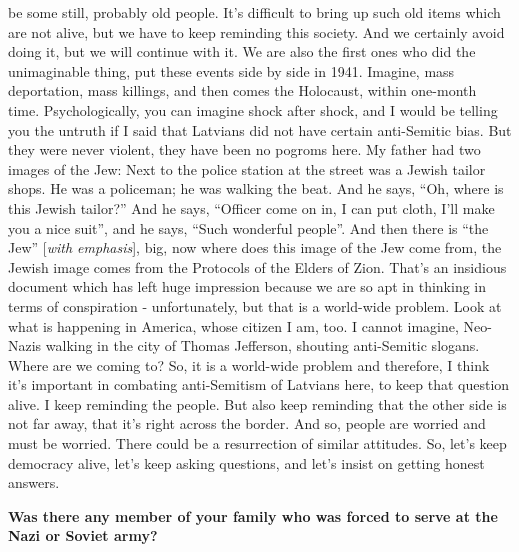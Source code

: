 be some still, probably old people. It’s difficult to bring up such old items which are not alive, but we have to keep reminding this society. And we certainly avoid doing it, but we will continue with it. We are also the first ones who did the unimaginable thing, put these events side by side in 1941. Imagine, mass deportation, mass killings, and then comes the Holocaust, within one-month time. Psychologically, you can imagine shock after shock, and I would be telling you the untruth if I said that Latvians did not have certain anti-Semitic bias. But they were never violent, they have been no pogroms here. My father had two images of the Jew: Next to the police station at the street was a Jewish tailor shops. He was a policeman; he was walking the beat. And he says, ``Oh, where is this Jewish tailor?'' And he says, ``Officer come on in, I can put cloth, I’ll make you a nice suit'', and he says, ``Such wonderful people''. And then there is ``the Jew'' [\textit{with emphasis}], big, now where does this image of the Jew come from, the Jewish image comes from the Protocols of the Elders of Zion. That’s an insidious document which has left huge impression because we are so apt in thinking in terms of conspiration - unfortunately, but that is a world-wide problem. Look at what is happening in America, whose citizen I am, too. I cannot imagine, Neo-Nazis walking in the city of Thomas Jefferson, shouting anti-Semitic slogans. Where are we coming to? So, it is a world-wide problem and therefore, I think it’s important in combating anti-Semitism of Latvians here, to keep that question alive. I keep reminding the people. But also keep reminding that the other side is not far away, that it’s right across the border. And so, people are worried and must be worried. There could be a resurrection of similar attitudes. So, let’s keep democracy alive, let’s keep asking questions, and let’s insist on getting honest answers.

\textbf{Was there any member of your family who was forced to serve at the Nazi or Soviet army?}

